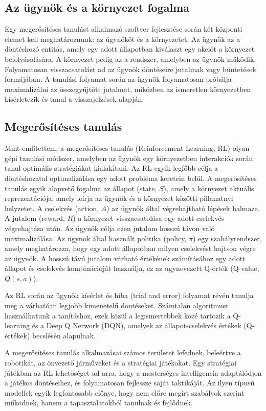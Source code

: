 \documentclass[
]{thesis-ekf}
\theoremstyle{definition}
\theoremstyle{remark}
\begin{document}
	\subsection{Az ügynök és a környezet fogalma}
	
	Egy megerősítéses tanulást alkalmazó szoftver fejlesztése során két központi elemet kell meghatároznunk: az ügynököt és a környezetet. Az ügynök az a döntéshozó entitás, amely egy adott állapotban kiválaszt egy akciót a környezet befolyásolására. A környezet pedig az a rendszer, amelyben az ügynök működik. Folyamatosan visszacsatolást ad az ügynök döntéseire jutalmak vagy büntetések formájában. A tanulási folyamat során az ügynök folyamatosan próbálja maximalizálni az összegyűjtött jutalmat, miközben az ismeretlen környezetben kísérletezik és tanul a visszajelzések alapján.
	
	\subsection{Megerősítéses tanulás}
	
	Mint említettem, a megerősítéses tanulás (Reinforcement Learning, RL) olyan gépi tanulási módszer, amelyben az ügynök egy környezetben interakciók során tanul optimális stratégiákat kialakítani. Az RL egyik legfőbb célja a döntéshozatal optimalizálása egy adott probléma keretein belül. \cite{RL} A megerősítéses tanulás egyik alapvető fogalma az állapot (state, $S$), amely a környezet aktuális reprezentációja, amely leírja az ügynök és a környezet közötti pillanatnyi helyzetet. A cselekvés (action, $A$) az ügynök által végrehajtható lépések halmaza. A jutalom (reward, $R$) a környezet visszacsatolása egy adott cselekvés végrehajtása után. Az ügynök célja ezen jutalom hosszú távon való maximalizálása. Az ügynök által használt politika (policy, $\pi$) egy szabályrendszer, amely meghatározza, hogy egy adott állapotban milyen cselekvést hajtson végre az ügynök. A hosszú távú jutalom várható értékének számításához egy adott állapot és cselekvés kombinációját használja, ez az úgynevezett Q-érték (Q-value, $Q(s,a)$).
	
	Az RL során az ügynök kísérlet és hiba (trial and error) folyamat révén tanulja meg a várhatóan legjobb kimenetelű döntéseket. Számtalan algoritmust használhatunk a tanításhoz, ezek közül a legismertebbek közé tartozik a Q-learning és a Deep Q Nerwork (DQN), amelyek az állapot-cselekvés értékek (Q-értékek) becslésén alapulnak.
	
	A megerősítéses tanulás alkalmazásai számos területet lefednek, beleértve a robotikát, az önvezető járműveket és a stratégiai játékokat. Egy stratégiai játékban az RL lehetőséget ad arra, hogy a mesterséges intelligencia adaptálódjon a játékos döntéseihez, és folyamatosan fejlessze saját taktikáját. Az ilyen típusú modellek egyik legfontosabb előnye, hogy nem előre megírt szabályok szerint működnek, hanem a tapasztalatokból tanulnak és fejlődnek.
	
\end{document}
